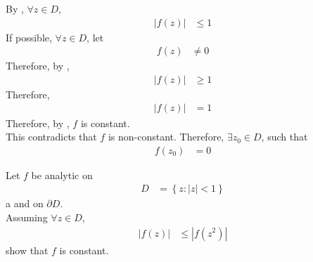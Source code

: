 \documentclass[titlepage, fleqn, a4paper, 12pt, twoside]{article}
\theoremstyle{definition}
\theoremstyle{theorem}
\begin{document}
\begin{solution}
	By , $\forall z \in D$,
	\begin{align*}
		\left| f(z) \right| & \le 1
	\end{align*}
	If possible, $\forall z \in D$, let
	\begin{align*}
		f(z) & \neq 0
	\end{align*}
	Therefore, by ,
	\begin{align*}
		\left| f(z) \right| & \ge 1
	\end{align*}
	Therefore,
	\begin{align*}
		\left| f(z) \right| & = 1
	\end{align*}
	Therefore, by , $f$ is constant.\\
	This contradicts that $f$ is non-constant.
	Therefore, $\exists z_0 \in D$, such that
	\begin{align*}
		f(z_0) & = 0
	\end{align*}
\end{solution}

\begin{question}
	Let $f$ be analytic on
	\begin{align*}
		D & = \left\{ z : |z| < 1 \right\}
	\end{align*}a
	and on $\partial D$.\\
	Assuming $\forall z \in D$,
	\begin{align*}
		\left| f(z) \right| & \le \left| f\left( z^2 \right) \right|
	\end{align*}
	show that $f$ is constant.
\end{question}
\end{document}
